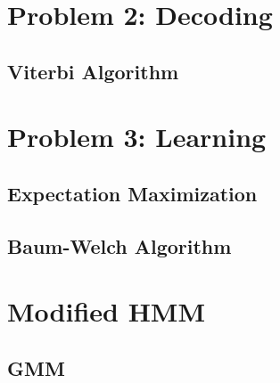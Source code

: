 \section{Problem 2: Decoding}
\subsection{Viterbi Algorithm}


\section{Problem 3: Learning}
\subsection{Expectation Maximization}
\subsection{Baum-Welch Algorithm}


\section{Modified HMM}
\subsection{GMM}




